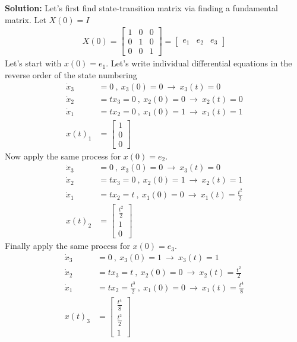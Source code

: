 \documentclass[twoside]{article}
\begin{document}
\textbf{Solution:} Let's first find state-transition matrix via finding a fundamental matrix. Let $X(0) = I$ 
%
\begin{align*}
	X(0) = \begin{bmatrix} 1 & 0 & 0 \\ 0 & 1 & 0 \\ 0 & 0 & 1 \end{bmatrix} 
	= \begin{bmatrix} e_1 & e_2 & e_3  \end{bmatrix} 
\end{align*}
% 
Let's start with $x(0) = e_1$. Let's write individual differential equations in the reverse order of the state numbering 
%
\begin{align*}
	\dot{x}_3 &= 0 \ , \ x_3(0) = 0 \ \rightarrow \ x_3(t) = 0
	\\
	\dot{x}_2 &= t x_3 = 0\ , \ x_2(0) = 0 \ \rightarrow \ x_2(t) = 0
	\\
	\dot{x}_1 &= t x_2 = 0 \ , \ x_1(0) = 1 \ \rightarrow \ x_1(t) = 1
	\\
	x(t)_1 &= \begin{bmatrix} 1 \\ 0 \\ 0 \end{bmatrix}
\end{align*}
% 
Now apply the same process for $x(0) = e_2$.
%
\begin{align*}
	\dot{x}_3 &= 0 \ , \ x_3(0) = 0 \ \rightarrow \ x_3(t) = 0
	\\
	\dot{x}_2 &= t x_3 = 0 \ , \ x_2(0) = 1 \ \rightarrow \ x_2(t) = 1
	\\
	\dot{x}_1 &= t x_2 = t \ , \ x_1(0) = 0 \ \rightarrow \ x_1(t) = \frac{t^2}{2}
	\\
	x(t)_2 &= \begin{bmatrix} \frac{t^2}{2} \\ 1 \\ 0 \end{bmatrix}
\end{align*}
%
Finally apply the same process for $x(0) = e_3$.
%
\begin{align*}
	\dot{x}_3 &= 0 \ , \ x_3(0) = 1 \ \rightarrow \ x_3(t) = 1
	\\
	\dot{x}_2 &= t x_3 = t \ , \ x_2(0) = 0 \ \rightarrow \ x_2(t) =  \frac{t^2}{2}
	\\
	\dot{x}_1 &= t x_2 = \frac{t^3}{2} \ , \ x_1(0) = 0 \ \rightarrow \ x_1(t) = \frac{t^4}{8}
	\\
	x(t)_3 &= \begin{bmatrix} \frac{t^4}{8} \\ \frac{t^2}{2} \\ 1 \end{bmatrix}
\end{align*}
\end{document}
